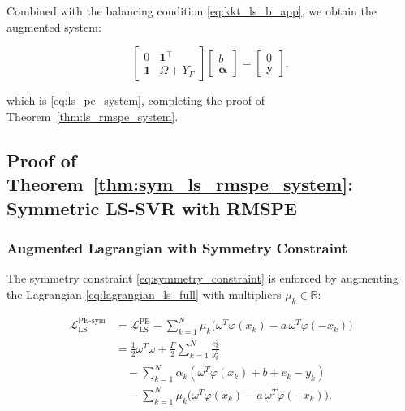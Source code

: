 \documentclass[mathematics,article,submit,pdftex,moreauthors]{Definitions/mdpi}
\begin{document}
Combined with the balancing condition \eqref{eq:kkt_ls_b_app}, we obtain the augmented system:
\begin{linenomath}
\begin{equation}
\begin{bmatrix}
0 & \mathbf{1}^\top\\
\mathbf{1} & \Omega + Y_\Gamma
\end{bmatrix}
\begin{bmatrix}
b\\
\boldsymbol{\alpha}
\end{bmatrix}
=
\begin{bmatrix}
0\\
\mathbf{y}
\end{bmatrix},
\end{equation}
\end{linenomath}
which is \eqref{eq:ls_pe_system}, completing the proof of Theorem~\ref{thm:ls_rmspe_system}.


\subsection{Proof of Theorem~\ref{thm:sym_ls_rmspe_system}: Symmetric LS-SVR with RMSPE}
\label{app:proof_sym_ls_rmspe}

\subsubsection{Augmented Lagrangian with Symmetry Constraint}

The symmetry constraint \eqref{eq:symmetry_constraint} is enforced by augmenting 
the Lagrangian \eqref{eq:lagrangian_ls_full} with multipliers $\mu_k \in \mathbb{R}$:
\begin{linenomath}
\begin{equation}\label{eq:lagrangian_ls_sym_full}
\begin{aligned}
\mathcal{L}_{\mathrm{LS}}^{\mathrm{PE\text{-}sym}} 
&= \mathcal{L}_{\mathrm{LS}}^{\mathrm{PE}}
- \sum_{k=1}^N \mu_k\bigl(\omega^T\varphi(x_k) - a\,\omega^T\varphi(-x_k)\bigr)\\
&= \frac{1}{2}\omega^T\omega + \frac{\Gamma}{2}\sum_{k=1}^N\frac{e_k^2}{y_k^2}\\
&\quad - \sum_{k=1}^N \alpha_k(\omega^T\varphi(x_k) + b + e_k - y_k)\\
&\quad - \sum_{k=1}^N \mu_k\bigl(\omega^T\varphi(x_k) - a\,\omega^T\varphi(-x_k)\bigr).
\end{aligned}
\end{equation}
\end{linenomath}
\end{document}
